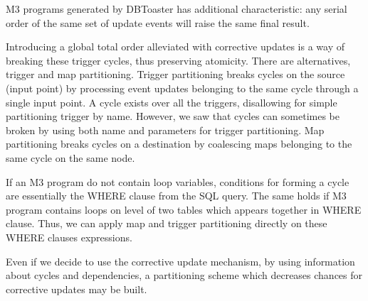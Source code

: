 \documentclass{sig-semester}
\begin{document}
M3 programs generated by DBToaster has additional characteristic: any serial order of the same set of update events will raise the same final result.

Introducing a global total order alleviated with corrective updates is a way of breaking these trigger cycles, thus preserving atomicity. There are alternatives, trigger and map partitioning. Trigger partitioning breaks cycles on the source (input point) by processing event updates belonging to the same cycle through a single input point. A cycle exists over all the triggers, disallowing for simple partitioning trigger by name. However, we saw that cycles can sometimes be broken by using both name and parameters for trigger partitioning. Map partitioning breaks cycles on a destination by coalescing maps belonging to the same cycle on the same node.

If an M3 program do not contain loop variables, conditions for forming a cycle are essentially the WHERE clause from the SQL query. The same holds if M3 program contains loops on level of two tables which appears together in WHERE clause. Thus, we can apply map and trigger partitioning directly on these WHERE clauses expressions.

Even if we decide to use the corrective update mechanism, by using information about cycles and dependencies, a partitioning scheme which decreases chances for corrective updates may be built.

%
%

\newpage
\end{document}
